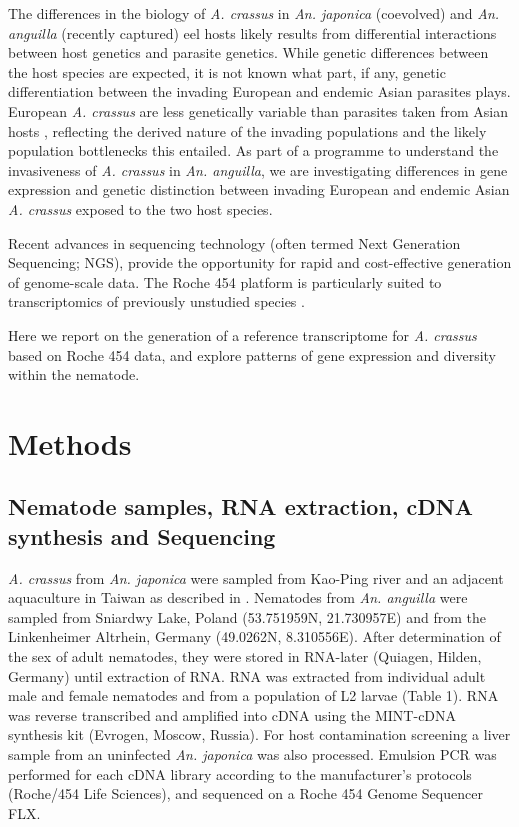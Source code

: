 \documentclass[10pt]{bmc_article}
\newenvironment{bmcformat}{\begin{raggedright}\baselineskip20pt\sloppy\setboolean{publ}{false}}{\end{raggedright}\baselineskip20pt\sloppy}
\begin{document}
\begin{bmcformat}
The differences in the biology of \textit{A. crassus} in
\textit{An. japonica} (coevolved) and \textit{An. anguilla} (recently
captured) eel hosts likely results from differential interactions
between host genetics and parasite genetics. While genetic differences
between the host species are expected, it is not known what part, if
any, genetic differentiation between the invading European and endemic
Asian parasites plays.  European \textit{A. crassus} are less
genetically variable than parasites taken from Asian hosts
\cite{wielgoss_population_2008}, reflecting the derived nature of the
invading populations and the likely population bottlenecks this
entailed. As part of a programme to understand the invasiveness of
\textit{A. crassus} in \textit{An. anguilla}, we are investigating
differences in gene expression and genetic distinction between
invading European and endemic Asian \textit{A. crassus} exposed to the
two host species.

Recent advances in sequencing technology (often termed Next Generation
Sequencing; NGS), provide the opportunity for rapid and cost-effective
generation of genome-scale data. The Roche 454 platform
\cite{pmid16056220} is particularly suited to transcriptomics of
previously unstudied species \cite{pmid20950480}.

Here we report on the generation of a reference transcriptome for
\textit{A. crassus} based on Roche 454 data, and explore patterns of
gene expression and diversity within the nematode.

\section*{Methods}


\subsection*{Nematode samples, RNA extraction, cDNA synthesis and Sequencing}

\textit{A. crassus} from \textit{An. japonica} were sampled from
Kao-Ping river and an adjacent aquaculture in Taiwan as described in
\cite{heitlinger_massive_2009}. Nematodes from \textit{An. anguilla}
were sampled from Sniardwy Lake, Poland (53.751959N, 21.730957E) and
from the Linkenheimer Altrhein, Germany (49.0262N, 8.310556E). After
determination of the sex of adult nematodes, they were stored in
RNA-later (Quiagen, Hilden, Germany) until extraction of RNA. RNA was
extracted from individual adult male and female nematodes and from a
population of L2 larvae (Table 1). RNA was reverse transcribed and
amplified into cDNA using the MINT-cDNA synthesis kit (Evrogen,
Moscow, Russia). For host contamination screening a liver sample from
an uninfected \textit{An. japonica} was also processed. Emulsion PCR
was performed for each cDNA library according to the manufacturer's
protocols (Roche/454 Life Sciences), and sequenced on a Roche 454
Genome Sequencer FLX.


\end{bmcformat}
\end{document}
